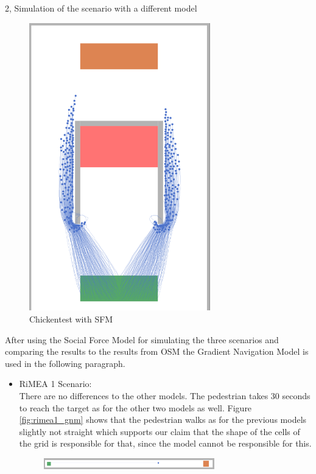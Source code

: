 \documentclass[10pt,a4paper]{article}
\begin{document}
\begin{task}{2, Simulation of the scenario with a different model}
\begin{itemize}
\begin{figure}[H]
        \includegraphics[width=0.7\textwidth]{pictures/sfm/chicken.png}
        \caption{Chickentest with SFM}
        \label{fig:chickentest_sfm}
    \end{figure}
\end{itemize}
After using the Social Force Model for simulating the three scenarios and comparing the results to the results from OSM the Gradient Navigation Model is used in the following paragraph.
\begin{itemize}
    \item RiMEA 1 Scenario:\\
    There are no differences to the other models. The pedestrian takes 30 seconds to reach the target as for the other two models as well. Figure \ref{fig:rimea1_gnm} shows that the pedestrian walks as for the previous models slightly not straight which supports our claim that the shape of the cells of the grid is responsible for that, since the model cannot be responsible for this.
    \begin{figure}[H]
        \centering
        \includegraphics[width=0.7\textwidth]{pictures/gnm/rimeatest1.png}

\end{figure}
\end{itemize}
\end{task}
\end{document}
